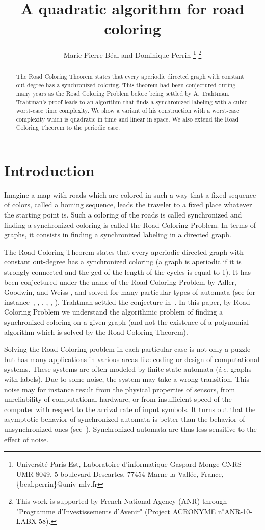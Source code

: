\documentclass[11pt,a4paper]{article}
\title{A quadratic algorithm for road coloring}
\author{Marie-Pierre B{\'e}al and Dominique Perrin
  \thanks{Universit\'e Paris-Est, Laboratoire d'informatique
    Gaspard-Monge CNRS UMR 8049, 5 boulevard Descartes, 77454
    Marne-la-Vall\'ee, France,
    \{beal,perrin\}@univ-mlv.fr}
    \thanks{This work is supported by
    French National Agency (ANR) through "Programme d'Investissements
    d'Avenir" (Project ACRONYME $\text{n}^\circ$ANR-10-LABX-58).}  }
\newcommand{\ie}{{\itshape i.e.}\xspace }
\begin{document}
\maketitle


\begin{abstract}
  The Road Coloring Theorem states that every aperiodic directed graph
  with constant out-degree has a synchronized coloring. This theorem
  had been conjectured during many years as the Road Coloring Problem
  before being settled by A. Trahtman. Trahtman's proof leads to an
  algorithm that finds a synchronized labeling with a cubic worst-case
  time complexity.  We show a variant of his construction with a
  worst-case complexity which is quadratic in time and linear in
  space. We also extend the Road Coloring Theorem to the periodic
  case.
\end{abstract}
\section{Introduction}

Imagine a map with roads which are colored in such a way that a fixed
sequence of colors, called a homing sequence, leads the traveler to a
fixed place whatever the starting point is.  Such a coloring of the
roads is called synchronized and finding a synchronized coloring is
called the Road Coloring Problem. In terms of graphs, it consists in
finding a synchronized labeling in a directed graph.

The Road Coloring Theorem states that every aperiodic directed graph
with constant out-degree has a synchronized coloring (a graph is
aperiodic if it is strongly connected and the gcd of the length of the
cycles is equal to 1).  It has been conjectured under the name of the
Road Coloring Problem by Adler, Goodwin, and Weiss
\cite{AdlerGoodwynWeiss77}, and solved for many particular types of
automata (see for instance~\cite{AdlerGoodwynWeiss77},
\cite{OBrien81}, \cite{Carbone01}, \cite{Kari03}, \cite{Friedman90},
\cite{PerrinSchutzenberger92}). Trahtman settled the conjecture
in~\cite{Trahtman09}. In this paper, by Road Coloring Problem we
understand the algorithmic problem of finding a synchronized coloring
on a given graph (and not the existence of a polynomial algorithm
which is solved by the Road Coloring Theorem).


Solving the Road Coloring problem in each particular case is not only
a puzzle but has many applications in various areas like coding or
design of computational systems.  These systems are often modeled by
finite-state automata (\ie graphs with labels).  Due to some noise,
the system may take a wrong transition.  This noise may for instance
result from the physical properties of sensors, from unreliability of
computational hardware, or from insufficient speed of the computer
with respect to the arrival rate of input symbols.  It turns out that
the asymptotic behavior of synchronized automata is better than the
behavior of unsynchronized ones (see~\cite{DelyonMaler94}).
Synchronized automata are thus less sensitive to the effect of noise.
\end{document}
